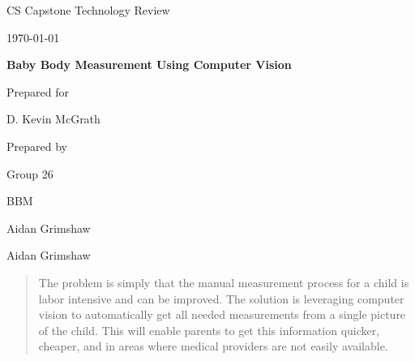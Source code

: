 \documentclass[onecolumn, draftclsnofoot,10pt, compsoc]{IEEEtran}
\def \CapstoneTeamName{		BBM}
\def \CapstoneTeamNumber{		26}
\def \GroupMemberOne{			Aidan Grimshaw}
\def \GroupMemberTwo{			Aidan Grimshaw}
\def \CapstoneProjectName{		Baby Body Measurement Using Computer Vision}
\def \CapstoneSponsorPerson{		D. Kevin McGrath}
\def \DocType{		%
				Technology Review
				}
\newcommand{\NameSigPair}[1]{\par
\makebox[2.75in][r]{#1} \hfil 	\makebox[3.25in]{\makebox[2.25in]{\hrulefill} \hfill		\makebox[.75in]{\hrulefill}}
\par\vspace{-12pt} \textit{\tiny\noindent
\makebox[2.75in]{} \hfil		\makebox[3.25in]{\makebox[2.25in][r]{Signature} \hfill	\makebox[.75in][r]{Date}}}}
\renewcommand{\NameSigPair}[1]{#1}
\begin{document}
\begin{titlepage}
    \begin{singlespace}
        \hfill 
        \par\vspace{.2in}
        \centering
        \scshape{
            \huge CS Capstone \DocType \par
            {\large\today}\par
            \vspace{.5in}
            \textbf{\Huge\CapstoneProjectName}\par
            \vfill
            {\large Prepared for}\par
            \Huge \CapstoneSponsorCompany\par
            \vspace{5pt}
            {\Large\NameSigPair{\CapstoneSponsorPerson}\par}
            {\large Prepared by }\par
            Group\CapstoneTeamNumber\par
            \CapstoneTeamName\par 
            \vspace{5pt}
            {\Large
                \NameSigPair{\GroupMemberOne}\par
                \NameSigPair{\GroupMemberTwo}\par
                \NameSigPair{\GroupMemberThree}\par
            }
            \vspace{20pt}
        }
        \begin{abstract}
  The problem is simply that the manual measurement process for a child is labor intensive and can be improved. The solution is leveraging computer vision to automatically get all needed measurements from a single picture of the child. This will enable parents to get this information quicker, cheaper, and in areas where medical providers are not easily available.
        \end{abstract}     
    \end{singlespace}
\end{titlepage}
\newpage
{}
\tableofcontents
\clearpage
\end{document}
